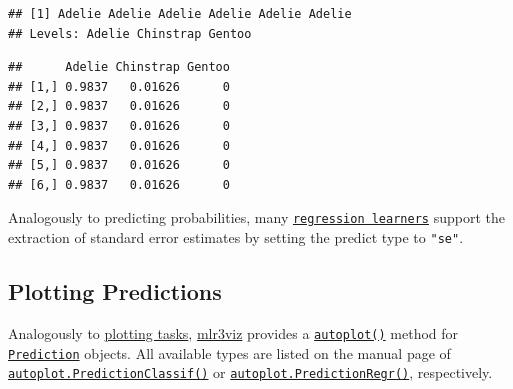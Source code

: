 \documentclass[
]{scrbook}
\newenvironment{Shaded}{\begin{snugshade}}{\end{snugshade}}
\newcommand{\CommentTok}[1]{\textcolor[rgb]{0.56,0.35,0.01}{\textit{#1}}}
\newcommand{\FunctionTok}[1]{\textcolor[rgb]{0.00,0.00,0.00}{#1}}
\newcommand{\NormalTok}[1]{#1}
\newcommand{\SpecialCharTok}[1]{\textcolor[rgb]{0.00,0.00,0.00}{#1}}
\renewenvironment{Shaded} {\begin{snugshade}\small} {\end{snugshade}}
\begin{document}
\begin{Shaded}
\end{Shaded}

\begin{verbatim}
## [1] Adelie Adelie Adelie Adelie Adelie Adelie
## Levels: Adelie Chinstrap Gentoo
\end{verbatim}

\begin{Shaded}
\end{Shaded}

\begin{verbatim}
##      Adelie Chinstrap Gentoo
## [1,] 0.9837   0.01626      0
## [2,] 0.9837   0.01626      0
## [3,] 0.9837   0.01626      0
## [4,] 0.9837   0.01626      0
## [5,] 0.9837   0.01626      0
## [6,] 0.9837   0.01626      0
\end{verbatim}

Analogously to predicting probabilities, many \href{https://mlr3.mlr-org.com/reference/LearnerRegr.html}{\texttt{regression\ learners}} support the extraction of standard error estimates by setting the predict type to \texttt{"se"}.

\hypertarget{autoplot-prediction}{%
\subsection{Plotting Predictions}\label{autoplot-prediction}}

Analogously to \protect\hyperlink{autoplot-task}{plotting tasks}, \href{https://mlr3viz.mlr-org.com}{mlr3viz} provides a \href{https://www.rdocumentation.org/packages/ggplot2/topics/autoplot}{\texttt{autoplot()}} method for \href{https://mlr3.mlr-org.com/reference/Prediction.html}{\texttt{Prediction}} objects.
All available types are listed on the manual page of \href{https://mlr3viz.mlr-org.com/reference/autoplot.PredictionClassif.html}{\texttt{autoplot.PredictionClassif()}} or \href{https://mlr3viz.mlr-org.com/reference/autoplot.PredictionRegr.html}{\texttt{autoplot.PredictionRegr()}}, respectively.
\end{document}
